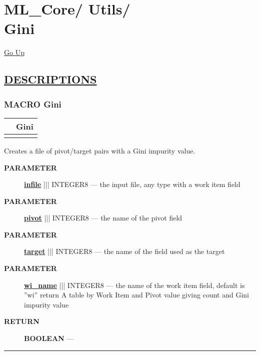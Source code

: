 \chapter*{\color{headfile}
{\large ML\_Core\slash\hspace{0pt}}
{\large Utils\slash\hspace{0pt}}
 \\
Gini
}
\hypertarget{ecldoc:toc:ML_Core.Utils.Gini}{}
\hyperlink{ecldoc:toc:root/ML_Core/Utils}{Go Up}


\section*{\underline{\textsf{DESCRIPTIONS}}}
\subsection*{\textsf{\colorbox{headtoc}{\color{white} MACRO}
Gini}}

\hypertarget{ecldoc:ml_core.utils.gini}{}

{\renewcommand{\arraystretch}{1.5}
\begin{tabularx}{\textwidth}{|>{\raggedright\arraybackslash}l|X|}
\hline
\hspace{0pt}\mytexttt{\color{red} } & \textbf{Gini} \\
\hline
\multicolumn{2}{|>{\raggedright\arraybackslash}X|}{\hspace{0pt}\mytexttt{\color{param} (infile, pivot, target, wi\_name='wi')}} \\
\hline
\end{tabularx}
}

\par





Creates a file of pivot/target pairs with a Gini impurity value.






\par
\begin{description}
\item [\colorbox{tagtype}{\color{white} \textbf{\textsf{PARAMETER}}}] \textbf{\underline{infile}} ||| INTEGER8 --- the input file, any type with a work item field
\item [\colorbox{tagtype}{\color{white} \textbf{\textsf{PARAMETER}}}] \textbf{\underline{pivot}} ||| INTEGER8 --- the name of the pivot field
\item [\colorbox{tagtype}{\color{white} \textbf{\textsf{PARAMETER}}}] \textbf{\underline{target}} ||| INTEGER8 --- the name of the field used as the target
\item [\colorbox{tagtype}{\color{white} \textbf{\textsf{PARAMETER}}}] \textbf{\underline{wi\_name}} ||| INTEGER8 --- the name of the work item field, default is ''wi'' return A table by Work Item and Pivot value giving count and Gini impurity value
\end{description}







\par
\begin{description}
\item [\colorbox{tagtype}{\color{white} \textbf{\textsf{RETURN}}}] \textbf{BOOLEAN} --- 
\end{description}




\rule{\linewidth}{0.5pt}
